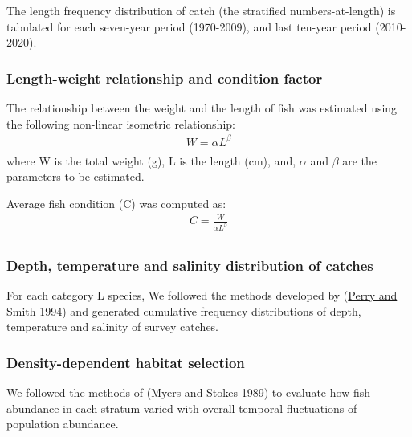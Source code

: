 \documentclass[12pt]{article}\usepackage[]{graphicx}\usepackage[]{color}
\begin{document}
The length frequency distribution of catch (the stratified numbers-at-length) is tabulated for each seven-year period (1970-2009), and last ten-year period (2010-2020).

\hypertarget{length-weight-relationship-and-condition-factor}{%
\subsubsection{Length-weight relationship and condition factor}\label{length-weight-relationship-and-condition-factor}}

The relationship between the weight and the length of fish was estimated using the following non-linear isometric relationship:
\begin{eqnarray*}\label{eqLengthWeight}
W = \alpha L ^\beta  
\\
\end{eqnarray*}
where W is the total weight (g), L is the length (cm), and, \(\alpha\) and \(\beta\) are the parameters to be estimated.

Average fish condition (C) was computed as:
\begin{eqnarray*}\label{eqCondition}
C = \frac{W}{\alpha L ^\beta}  
\\
\end{eqnarray*}
\hypertarget{depth-temperature-and-salinity-distribution-of-catches}{%
\subsubsection{Depth, temperature and salinity distribution of catches}\label{depth-temperature-and-salinity-distribution-of-catches}}

For each category L species, We followed the methods developed by (\protect\hyperlink{ref-Perry:Smith:1994:cjfas}{Perry and Smith 1994}) and generated cumulative frequency distributions of depth, temperature and salinity of survey catches.

\hypertarget{density-dependent-habitat-selection}{%
\subsubsection{Density-dependent habitat selection}\label{density-dependent-habitat-selection}}

We followed the methods of (\protect\hyperlink{ref-Myers:Stokes:1989}{Myers and Stokes 1989}) to evaluate how fish abundance in each stratum varied with overall temporal fluctuations of population abundance.
\end{document}
